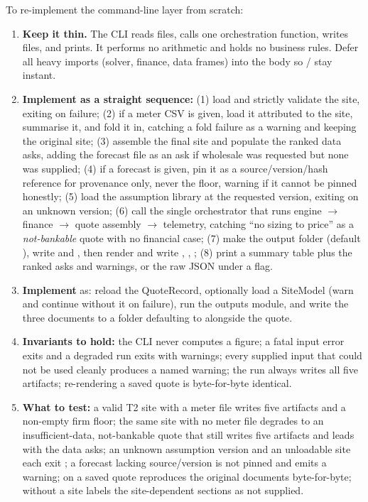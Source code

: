 \begin{rebuild}
To re-implement the command-line layer from scratch:
\begin{enumerate}
  \item \textbf{Keep it thin.} The CLI reads files, calls one orchestration function, writes files, and prints. It performs no arithmetic and holds no business rules. Defer all heavy imports (solver, finance, data frames) into the  body so / stay instant.
  \item \textbf{Implement  as a straight sequence:} (1) load and strictly validate the site, exiting  on failure; (2) if a meter CSV is given, load it attributed to the site, summarise it, and fold it in, catching a fold failure as a warning and keeping the original site; (3) assemble the final site and populate the ranked data asks, adding the forecast file as an ask if wholesale was requested but none was supplied; (4) if a forecast is given, pin it as a source/version/hash reference for provenance only, never the floor, warning if it cannot be pinned honestly; (5) load the assumption library at the requested version, exiting  on an unknown version; (6) call the single orchestrator that runs engine $\rightarrow$ finance $\rightarrow$ quote assembly $\rightarrow$ telemetry, catching ``no sizing to price'' as a \emph{not-bankable} quote with no financial case; (7) make the output folder (default ), write  and , then render and write , , ; (8) print a summary table plus the ranked asks and warnings, or the raw JSON under a flag.
  \item \textbf{Implement } as: reload the QuoteRecord, optionally load a SiteModel (warn and continue without it on failure), run the outputs module, and write the three documents to a folder defaulting to alongside the quote.
  \item \textbf{Invariants to hold:} the CLI never computes a figure; a fatal input error exits  and a degraded run exits  with warnings; every supplied input that could not be used cleanly produces a named warning; the run always writes all five artifacts; re-rendering a saved quote is byte-for-byte identical.
  \item \textbf{What to test:} a valid T2 site with a meter file writes five artifacts and a non-empty firm floor; the same site with no meter file degrades to an insufficient-data, not-bankable quote that still writes five artifacts and leads with the data asks; an unknown assumption version and an unloadable site each exit ; a forecast lacking source/version is not pinned and emits a warning;  on a saved quote reproduces the original documents byte-for-byte;  without a site labels the site-dependent sections as not supplied.
\end{enumerate}
\end{rebuild}

